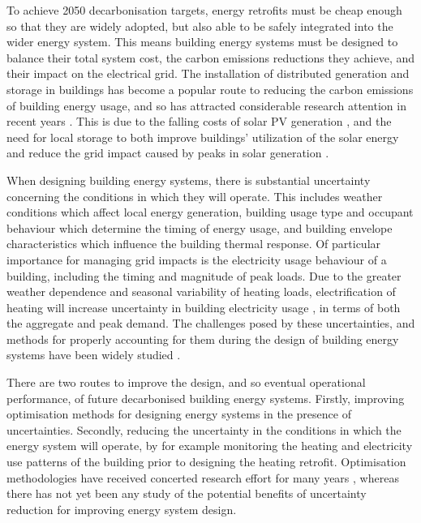 To achieve 2050 decarbonisation targets, energy retrofits must be cheap enough so that they are widely adopted, but also able to be safely integrated into the wider energy system. This means building energy systems must be designed to balance their total system cost, the carbon emissions reductions they achieve, and their impact on the electrical grid.
The installation of distributed generation and storage in buildings has become a popular route to reducing the carbon emissions of building energy usage, and so has attracted considerable research attention in recent years \citep{li2023ReviewPhotovoltaicBattery,niveditha2022OptimalSizingHybrid,sharma2020EconomicPerformanceAssessment,novoa2019OptimalRenewableGeneration,salvador2012MethodologyDesignEnergy,tumminia2020GridInteractionEnvironmental}.
This is due to the falling costs of solar PV generation \citep{irena2023RenewablePowerGeneration}, and the need for local storage to both improve buildings' utilization of the solar energy and reduce the grid impact caused by peaks in solar generation \citep{li2023ReviewPhotovoltaicBattery}.

When designing building energy systems, there is substantial uncertainty concerning the conditions in which they will operate. This includes weather conditions which affect local energy generation, building usage type and occupant behaviour which determine the timing of energy usage, and building envelope characteristics which influence the building thermal response.
Of particular importance for managing grid impacts is the electricity usage behaviour of a building, including the timing and magnitude of peak loads. Due to the greater weather dependence and seasonal variability of heating loads, electrification of heating will increase uncertainty in building electricity usage \citep{deroubaix2021LargeUncertaintiesTrends,egging-bratseth2021SeasonalStorageDemand}, in terms of both the aggregate and peak demand.
The challenges posed by these uncertainties, and methods for properly accounting for them during the design of building energy systems have been widely studied \citep{zhu2022UncertaintySensitivityAnalysis,decarolis2017FormalizingBestPractice,fodstad2022NextFrontiersEnergy,mavromatidis2018ReviewUncertaintyCharacterisation,tian2018ReviewUncertaintyAnalysis}.

There are two routes to improve the design, and so eventual operational performance, of future decarbonised building energy systems. Firstly, improving optimisation methods for designing energy systems in the presence of uncertainties. Secondly, reducing the uncertainty in the conditions in which the energy system will operate, by for example monitoring the heating and electricity use patterns of the building prior to designing the heating retrofit. Optimisation methodologies have received concerted research effort for many years \citep{connolly2010ReviewComputerTools,fodstad2022NextFrontiersEnergy}, whereas there has not yet been any study of the potential benefits of uncertainty reduction for improving energy system design.


